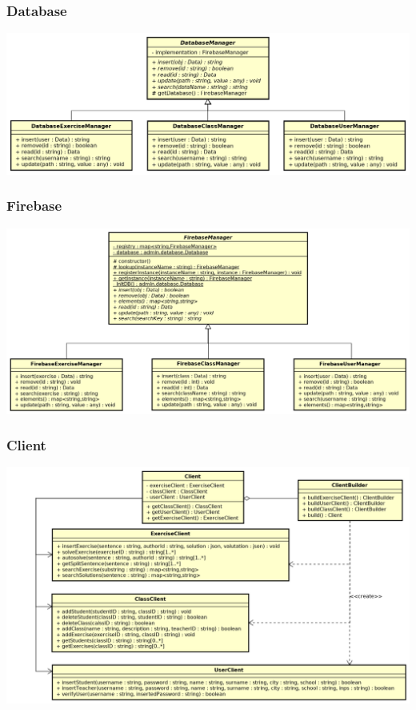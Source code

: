 \subsubsection{Database}
\includegraphics[scale=0.5]{images/DatabaseManager.png}
\subsubsection{Firebase}
\includegraphics[scale=0.5]{images/FirebaseManager.png}
\subsubsection{Client}
\includegraphics[scale=0.5]{images/Client.png}